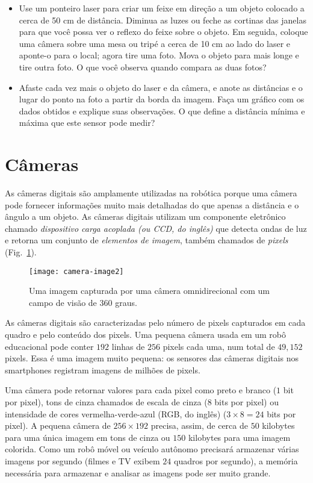 \begin{framed}

\begin{itemize}
\item Use um ponteiro laser para criar um feixe em direção a um objeto colocado a cerca de 50 cm de distância. Diminua as luzes ou feche as cortinas das janelas para que você possa ver o reflexo do feixe sobre o objeto. Em seguida, coloque uma câmera sobre uma mesa ou tripé a cerca de 10 cm ao lado do laser e aponte-o para o local; agora tire uma foto. Mova o objeto para mais longe e tire outra foto. O que você observa quando compara as duas fotos?
\item Afaste cada vez mais o objeto do laser e da câmera, e anote as distâncias e o lugar do ponto na foto a partir da borda da imagem. Faça um gráfico com os dados obtidos e explique suas observações. O que define a distância mínima e máxima que este sensor pode medir?
\end{itemize}
\end{framed}

\section{Câmeras}\label{s.cameras}

As câmeras digitais são amplamente utilizadas na robótica porque uma câmera pode fornecer informações muito mais detalhadas do que apenas a distância e o ângulo a um objeto. As câmeras digitais utilizam um componente eletrônico chamado \emph{dispositivo carga acoplada (ou CCD, do inglês)} que detecta ondas de luz e retorna um conjunto de \emph{elementos de imagem}, também chamados de \emph{pixels} (Fig.~\ref{fig.camera}).

\begin{figure}
\texttt{[image: camera-image2]}
\caption{Uma imagem capturada por uma câmera omnidirecional com um campo de visão de 360 graus.}\label{fig.camera}
\end{figure}

As câmeras digitais são caracterizadas pelo número de pixels capturados em cada quadro e pelo conteúdo dos pixels. Uma pequena câmera usada em um robô educacional pode conter  $192$ linhas de $256$ pixels cada uma, num total de $49,\!152$ pixels. Essa é uma imagem muito pequena: os sensores das câmeras digitais nos smartphones registram imagens de milhões de pixels.

Uma câmera pode retornar valores para cada pixel como preto e branco ($1$ bit por pixel), tons de cinza chamados de escala de cinza ($8$ bits por pixel) ou intensidade de cores vermelha-verde-azul (RGB, do inglês) ($3\times 8=24$ bits por pixel). A pequena câmera de $256\times 192$ precisa, assim, de cerca de $50$ kilobytes para uma única imagem em tons de cinza ou $150$ kilobytes para uma imagem colorida. Como um robô móvel ou veículo autônomo precisará armazenar várias imagens por segundo (filmes e TV exibem $24$ quadros por segundo), a memória necessária para armazenar e analisar as imagens pode ser muito grande.

